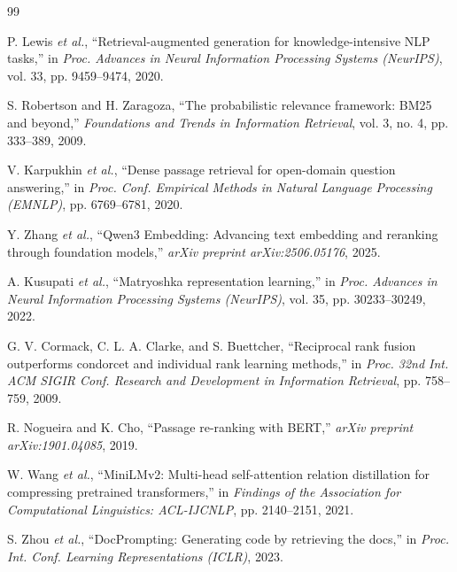 \begingroup
\raggedright
\begin{thebibliography}{99}
\setlength{\itemsep}{3pt}

 P. Lewis \textit{et al.}, ``Retrieval-augmented generation for knowledge-intensive NLP tasks,'' in \textit{Proc. Advances in Neural Information Processing Systems (NeurIPS)}, vol. 33, pp. 9459--9474, 2020.

 S. Robertson and H. Zaragoza, ``The probabilistic relevance framework: BM25 and beyond,'' \textit{Foundations and Trends in Information Retrieval}, vol. 3, no. 4, pp. 333--389, 2009.

 V. Karpukhin \textit{et al.}, ``Dense passage retrieval for open-domain question answering,'' in \textit{Proc. Conf. Empirical Methods in Natural Language Processing (EMNLP)}, pp. 6769--6781, 2020.

 Y. Zhang \textit{et al.}, ``Qwen3 Embedding: Advancing text embedding and reranking through foundation models,'' \textit{arXiv preprint arXiv:2506.05176}, 2025.

 A. Kusupati \textit{et al.}, ``Matryoshka representation learning,'' in \textit{Proc. Advances in Neural Information Processing Systems (NeurIPS)}, vol. 35, pp. 30233--30249, 2022.

 G. V. Cormack, C. L. A. Clarke, and S. Buettcher, ``Reciprocal rank fusion outperforms condorcet and individual rank learning methods,'' in \textit{Proc. 32nd Int. ACM SIGIR Conf. Research and Development in Information Retrieval}, pp. 758--759, 2009.

 R. Nogueira and K. Cho, ``Passage re-ranking with BERT,'' \textit{arXiv preprint arXiv:1901.04085}, 2019.

 W. Wang \textit{et al.}, ``MiniLMv2: Multi-head self-attention relation distillation for compressing pretrained transformers,'' in \textit{Findings of the Association for Computational Linguistics: ACL-IJCNLP}, pp. 2140--2151, 2021.

 S. Zhou \textit{et al.}, ``DocPrompting: Generating code by retrieving the docs,'' in \textit{Proc. Int. Conf. Learning Representations (ICLR)}, 2023.


\end{thebibliography}
